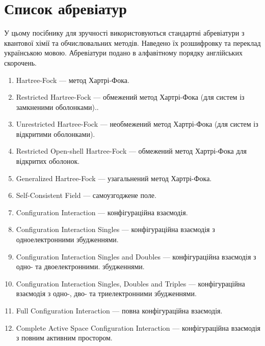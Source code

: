 
\section{Список абревіатур}

У цьому посібнику для зручності використовуються стандартні абревіатури з квантової хімії та обчислювальних методів. Наведено їх розшифровку та переклад українською мовою. Абревіатури подано в алфавітному порядку англійських скорочень.

\begin{enumerate}[
    leftmargin=10em,
    font=\bfseries,   %
    labelindent=5em,%
    leftmargin=*,     %
]
    \item[HF] Hartree-Fock --- метод Хартрі-Фока.
    \item[RHF] Restricted Hartree-Fock --- обмежений метод Хартрі-Фока (для систем із замкненими оболонками)..
    \item[UHF] Unrestricted Hartree-Fock --- необмежений метод Хартрі-Фока (для систем із відкритими оболонками).
    \item[ROHF] Restricted Open-shell Hartree-Fock --- обмежений метод Хартрі-Фока для відкритих оболонок.
    \item[GHF] Generalized Hartree-Fock --- узагальнений метод Хартрі-Фока.

    \item[SCF] Self-Consistent Field --- самоузгоджене поле.

    \item[CI] Configuration Interaction --- конфігураційна взаємодія.
    \item[CIS] Configuration Interaction Singles --- конфігураційна взаємодія з одноелектронними збудженнями.
    \item[CISD] Configuration Interaction Singles and Doubles --- конфігураційна взаємодія з одно- та двоелектронними. збудженнями.
    \item[CISDT] Configuration Interaction Singles, Doubles and Triples --- конфігураційна взаємодія з одно-, дво- та триелектронними збудженнями.
    \item[FCI] Full Configuration Interaction --- повна конфігураційна взаємодія.
    \item[CASCI] Complete Active Space Configuration Interaction --- конфігураційна взаємодія з повним активним простором.


\end{enumerate}
